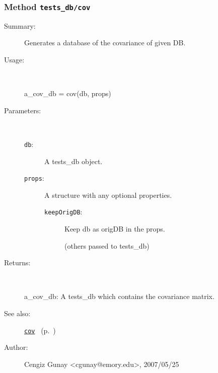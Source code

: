 \subsubsection[Method \texttt{cov}]{Method \texttt{tests\_db/cov}}%
%
\label{ref_tests_db__cov}%
\hypertarget{ref_tests_db__cov}{}%
\begin{description}
\item[Summary:]Generates a database of the covariance of given DB.
%
\item[Usage:]~%
\begin{lyxcode}%
a\_cov\_db = cov(db, props)
%
\end{lyxcode}%
%
%
\item[Parameters:]~
\begin{description}%
\item[\texttt{db}:]
 A tests\_db object.
\item[\texttt{props}:]
 A structure with any optional properties.
\begin{description}%
\item[\texttt{keepOrigDB}:]
 Keep db as origDB in the props.

(others passed to tests\_db)\end{description}%
\end{description}%
%
\item[Returns:]~

	a\_cov\_db: A tests\_db which contains the covariance matrix.
%
%
\item[See also:]%
\hyperlink{ref_cov}{\texttt{cov}}%
\ (p.~\pageref{ref_cov})%
%
%
\item[Author:]%
Cengiz Gunay <cgunay@emory.edu>, 2007/05/25%
\end{description}
\methodline%

